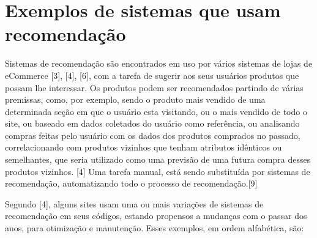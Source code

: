 \documentclass[12pt,
				openright,
				twoside,
				a4paper,
				apter=TITLE,
				section=TITLE,
				subsection=TITLE,
				chapter=TITLE,
				english,
				brazil]{abntex2}
\begin{document}
\section{Exemplos de sistemas que usam recomendação}
Sistemas de recomendação são encontrados em uso por vários sistemas de lojas de eCommerce [3], [4], [6], com a tarefa de sugerir aos seus usuários produtos que possam lhe interessar. Os produtos podem ser recomendados partindo de várias premissas, como, por exemplo, sendo o produto mais vendido de uma determinada seção em que o usuário esta visitando, ou o
mais vendido de todo o site, ou baseado em dados coletados do usuário como referência, ou analisando compras feitas pelo usuário com os dados dos produtos comprados no passado, correlacionando com produtos vizinhos que tenham atributos idênticos ou semelhantes, que seria utilizado como uma previsão de uma futura compra desses produtos vizinhos. [4] Uma
tarefa manual, está sendo substituída por sistemas de recomendação, automatizando todo o processo de recomendação.[9] 

Segundo [4], alguns sites usam uma ou mais variações de sistemas de recomendação em seus códigos, estando propensos a mudanças com o passar dos anos, para otimização e manutenção. Esses exemplos, em ordem alfabética, são: 
\end{document}
